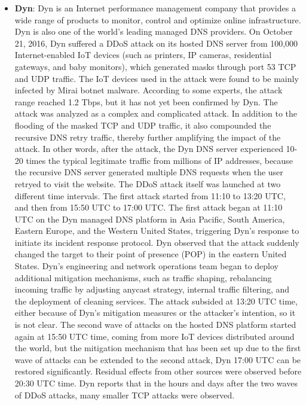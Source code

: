 \documentclass[conference]{IEEEtran}
\begin{document}
\begin{itemize}
\item{\textbf{Dyn}: Dyn is an Internet performance management company that provides a wide range of products to monitor, control and optimize online infrastructure. Dyn is also one of the world's leading managed DNS providers. On October 21, 2016, Dyn suffered a DDoS attack on its hosted DNS server from 100,000 Internet-enabled IoT devices (such as printers, IP cameras, residential gateways, and baby monitors), which generated masks through port 53 TCP and UDP traffic. The IoT devices used in the attack were found to be mainly infected by Mirai botnet malware. According to some experts, the attack range reached 1.2 Tbps, but it has not yet been confirmed by Dyn. The attack was analyzed as a complex and complicated attack. In addition to the flooding of the masked TCP and UDP traffic, it also compounded the recursive DNS retry traffic, thereby further amplifying the impact of the attack. In other words, after the attack, the Dyn DNS server experienced 10-20 times the typical legitimate traffic from millions of IP addresses, because the recursive DNS server generated multiple DNS requests when the user retryed to visit the website. The DDoS attack itself was launched at two different time intervals. The first attack started from 11:10 to 13:20 UTC, and then from 15:50 UTC to 17:00 UTC. The first attack began at 11:10 UTC on the Dyn managed DNS platform in Asia Pacific, South America, Eastern Europe, and the Western United States, triggering Dyn’s response to initiate its incident response protocol. Dyn observed that the attack suddenly changed the target to their point of presence (POP) in the eastern United States. Dyn's engineering and network operations team began to deploy additional mitigation mechanisms, such as traffic shaping, rebalancing incoming traffic by adjusting anycast strategy, internal traffic filtering, and the deployment of cleaning services. The attack subsided at 13:20 UTC time, either because of Dyn's mitigation measures or the attacker's intention, so it is not clear. The second wave of attacks on the hosted DNS platform started again at 15:50 UTC time, coming from more IoT devices distributed around the world, but the mitigation mechanism that has been set up due to the first wave of attacks can be extended to the second attack, Dyn 17:00 UTC can be restored significantly. Residual effects from other sources were observed before 20:30 UTC time. Dyn reports that in the hours and days after the two waves of DDoS attacks, many smaller TCP attacks were observed.\\

}
\end{itemize}
\end{document}
